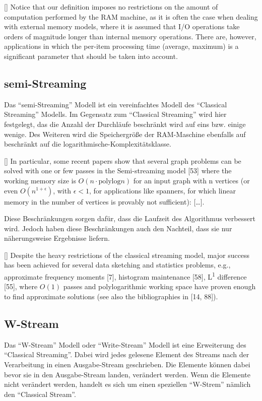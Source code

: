 [\cite{Ribichini2007}]{
Notice that our definition imposes no restrictions on the amount
of computation performed by the RAM machine, as it is often the case when
dealing with external memory models, where it is assumed that I/O operations
take orders of magnitude longer than internal memory operations. There
are, however, applications in which the per-item processing time (average,
maximum) is a significant parameter that should be taken into account.
}

\subsection{semi-Streaming}
Das \enquote{semi-Streaming} Modell ist ein vereinfachtes Modell des
\enquote{Classical Streaming} Modells. Im Gegensatz zum \enquote{Classical Streaming}
wird hier festgelegt, das die Anzahl der Durchläufe beschränkt wird auf eins bzw.
einige wenige. Des Weiteren wird die Speichergröße der RAM-Maschine ebenfalls
auf beschränkt auf die logarithmische-Komplexitätsklasse.

[\cite{Ribichini2007}]{
In particular, some recent papers show that several graph problems can be
solved with one or few passes in the Semi-streaming model [53] where the
working memory size is $O(n · \text{polylog} n)$ for an input graph with n
vertices (or even $O(n^{1 + \epsilon})$, with $\epsilon < 1$, for applications
like spanners, for which linear memory in the number of vertices is provably not
sufficient): [\dots].
}

Diese Beschränkungen sorgen dafür, dass die Laufzeit des Algorithmus verbessert
wird. Jedoch haben diese Beschränkungen auch den Nachteil, dass sie nur
näherungsweise Ergebnisse liefern.

[\cite{Ribichini2007}]{
Despite the heavy restrictions of the classical streaming model, major
success has been achieved for several data sketching and statistics problems,
e.g., approximate frequency moments [7], histogram maintenance [58],
L\textsuperscript{1} difference [55], where $O(1)$ passes and polylogarithmic
working space have proven enough to find approximate solutions (see also the
bibliographies in [14, 88]).
}

\subsection{W-Stream}
Das \enquote{W-Stream} Modell oder \enquote{Write-Stream} Modell ist eine
Erweiterung des \enquote{Classical Streaming}. Dabei wird jedes gelesene Element
des Streams nach der Verarbeitung in einen Ausgabe-Stream geschrieben. Die
Elemente können dabei bevor sie in den Ausgabe-Stream landen, verändert werden.
Wenn die Elemente nicht verändert werden, handelt es sich um einen speziellen
\enquote{W-Strem} nämlich den \enquote{Classical Stream}.

